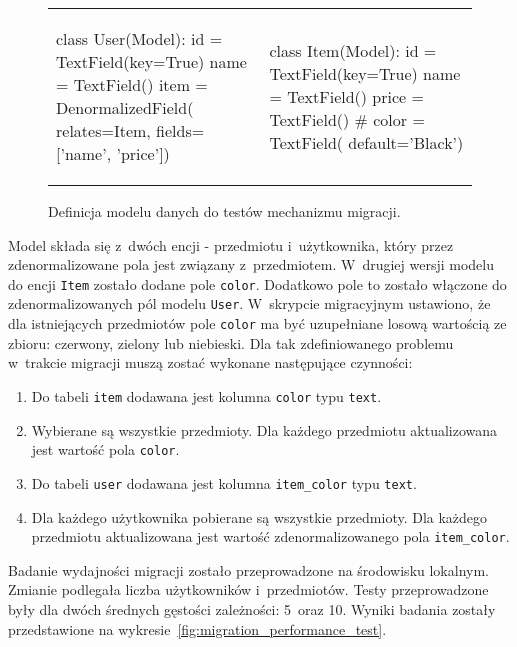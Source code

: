 \begin{figure}[ht!]
	\centering

	\begin{tabular}{p{7cm} p{7cm}}
		\begin{verbbox}
			class User(Model):
			    id = TextField(key=True)
			    name = TextField()
			    item = DenormalizedField(
			        relates=Item,
			        fields=['name', 'price'])
		\end{verbbox}

		\theverbbox & 

		\begin{verbbox}
			class Item(Model):
			    id = TextField(key=True)
			    name = TextField()
			    price = TextField()
			    # color = TextField(
			    	default='Black')
		\end{verbbox}

		\theverbbox \\
	\end{tabular}

	\caption{Definicja modelu danych do testów mechanizmu migracji.}
	\label{vrb:migrations_data_model_for_tests}
\end{figure}

Model składa się z~dwóch encji - przedmiotu i~użytkownika, który przez zdenormalizowane pola jest związany z~przedmiotem. W~drugiej wersji modelu do encji \verb+Item+ zostało dodane pole \verb+color+. Dodatkowo pole to zostało włączone do zdenormalizowanych pól modelu \verb+User+. W~skrypcie migracyjnym ustawiono, że dla istniejących przedmiotów pole \verb+color+ ma być uzupełniane losową wartością ze zbioru: czerwony, zielony lub niebieski. Dla tak zdefiniowanego problemu w~trakcie migracji muszą zostać wykonane następujące czynności:

\begin{enumerate}
	\item Do tabeli \verb+item+ dodawana jest kolumna \verb+color+ typu \verb+text+.
	\item Wybierane są wszystkie przedmioty. Dla każdego przedmiotu aktualizowana jest wartość pola \verb+color+.
	\item Do tabeli \verb+user+ dodawana jest kolumna \verb+item_color+ typu \verb+text+.
	\item Dla każdego użytkownika pobierane są wszystkie przedmioty. Dla każdego przedmiotu aktualizowana jest wartość zdenormalizowanego pola \verb+item_color+.
\end{enumerate}

Badanie wydajności migracji zostało przeprowadzone na środowisku lokalnym. Zmianie podlegała liczba użytkowników i~przedmiotów. Testy przeprowadzone były dla dwóch średnych gęstości zależności: 5~oraz 10. Wyniki badania zostały przedstawione na wykresie~\ref{fig:migration_performance_test}.

